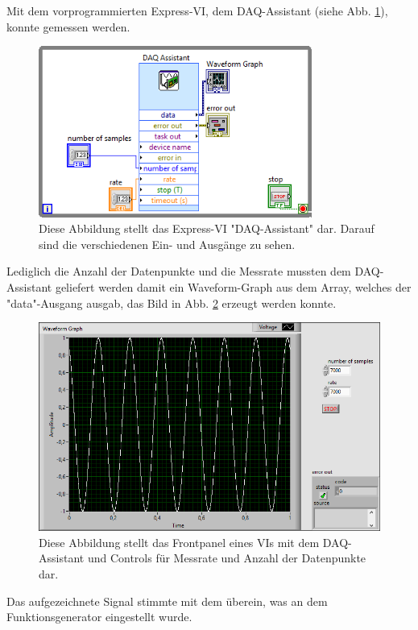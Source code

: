 		Mit dem vorprogrammierten Express-VI, dem DAQ-Assistant (siehe Abb. \ref{fig:daq}), konnte gemessen werden.
		\begin{figure}[ht]
			\centering
			\includegraphics[width=0.8\textwidth]{pic/daq.png}
			\caption{Diese Abbildung stellt das Express-VI "DAQ-Assistant" dar. Darauf sind die verschiedenen Ein- und Ausgänge zu sehen.}
			\label{fig:daq}	
		\end{figure}
		Lediglich die Anzahl der Datenpunkte und die Messrate mussten dem DAQ-Assistant geliefert werden damit ein Waveform-Graph aus dem Array, welches der "data"-Ausgang ausgab, das Bild in Abb. \ref{fig:daq_sig} erzeugt werden konnte. 
		\begin{figure}[ht]
			\centering
			\includegraphics[width=\textwidth]{pic/daq_sig.png}
			\caption{Diese Abbildung stellt das Frontpanel eines VIs mit dem DAQ-Assistant und Controls für Messrate und Anzahl der Datenpunkte dar.}
			\label{fig:daq_sig}	
		\end{figure}
		Das aufgezeichnete Signal stimmte mit dem überein, was an dem Funktionsgenerator eingestellt wurde.
	
	\newpage
